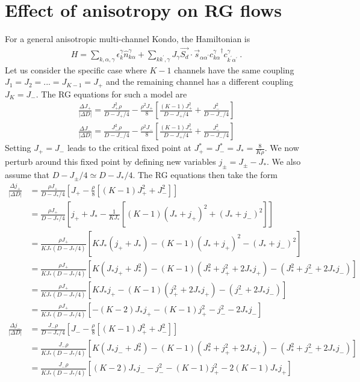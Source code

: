 \documentclass[12pt]{revtex4-2}
\begin{document}
\section{Effect of anisotropy on RG flows}
For a general anisotropic multi-channel Kondo, the Hamiltonian is
\begin{align}
	H = \sum_{k,\alpha,\gamma}\epsilon_{k}^\gamma \hat n^\gamma_{k\alpha} + \sum_{kk^\prime,\gamma}J_\gamma \vec{S_d}\cdot\vec{s}_{\alpha\alpha^\prime}{c^\gamma_{k\alpha}}^\dagger c^\gamma_{k^\prime\alpha^\prime}~.
\end{align}
Let us consider the specific case where \(K-1\) channels have the same coupling \(J_1 = J_2 = ... = J_{K-1} = J_+\) and the remaining channel has a different coupling \(J_K = J_-\). The RG equations for such a model are
\begin{align}
	\frac{\Delta J_+}{|\Delta D|} = \frac{J_+^2 \rho}{D - J_+/4} - \frac{\rho^2 J_+}{8}\left[\frac{(K-1)J_+^2}{D - J_+/4} + \frac{J_-^2}{D - J_-/4}\right]\\
	\frac{\Delta J_-}{|\Delta D|} = \frac{J_-^2 \rho}{D - J_-/4} - \frac{\rho^2 J_-}{8}\left[\frac{(K-1)J_+^2}{D - J_+/4} + \frac{J_-^2}{D - J_-/4}\right]
\end{align}
Setting \(J_+ = J_-\) leads to the critical fixed point at \(J_+^* = J_-^* = J_* = \frac{8}{K \rho}\). We now perturb around this fixed point by defining new variables \(j_\pm = J_\pm - J_*\). We also assume that \(D - J_\pm / 4 \simeq D - J_*/4\). The RG equations then take the form
\begin{align}
	\frac{\Delta j_+}{|\Delta D|} &= \frac{\rho J_+}{D - J_*/4}\left[J_+ - \frac{\rho}{8}\left[(K-1)J_+^2 + J_-^2\right]\right]\\
				      &= \frac{\rho J_+}{D - J_*/4}\left[j_+ + J_*- \frac{1}{K J_*}\left[(K-1)\left(J_* + j_+\right)^2 + \left(J_* + j_-\right)^2\right]\right]\\
				      &= \frac{\rho J_+}{K J_*\left(D - J_*/4\right)}\left[KJ_*\left(j_+ + J_*\right) - (K-1)\left(J_* + j_+\right)^2 - \left(J_* + j_-\right)^2\right]\\
				      &= \frac{\rho J_+}{K J_*\left(D - J_*/4\right)}\left[K\left(J_*j_+ + J_*^2\right) - (K-1)\left(J_*^2 + j_+^2 + 2J_* j_+\right) - \left(J_*^2 + j_-^2 + 2J_* j_-\right)\right]\\
				      &= \frac{\rho J_+}{K J_*\left(D - J_*/4\right)}\left[KJ_*j_+ - (K-1)\left(j_+^2 + 2J_* j_+\right) - \left(j_-^2 + 2J_* j_-\right)\right]\\
				      &= \frac{\rho J_+}{K J_*\left(D - J_*/4\right)}\left[-\left(K - 2\right)J_*j_+ - (K-1)j_+^2 - j_-^2 - 2J_* j_-\right]\\
	\frac{\Delta j_-}{|\Delta D|} &= \frac{J_- \rho}{D - J_*/4}\left[J_- - \frac{\rho}{8}\left[(K-1)J_+^2 + J_-^2\right]\right]\\
				      &= \frac{J_- \rho}{K J_*\left(D - J_*/4\right)}\left[K\left(J_*j_- + J_*^2\right) - (K-1)\left(J_*^2 + j_+^2 + 2J_* j_+\right) - \left(J_*^2 + j_-^2 + 2J_* j_-\right)\right]\\
				      &= \frac{J_- \rho}{K J_*\left(D - J_*/4\right)}\left[\left(K - 2\right)J_*j_-  - j_-^2 - (K-1)j_+^2 - 2(K-1)J_* j_+\right]\\
\end{align}
\end{document}

